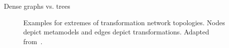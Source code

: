 Dense graphs vs. trees

\begin{figure}
    \centering
    \begin{minipage}[b]{0.49\columnwidth}
        \centering
        
        \label{fig:properties:topologies:full}
    \end{minipage}
    \hfill
    \begin{minipage}[b]{0.49\columnwidth}
        \centering
        
        \vspace{1em}
        \label{fig:properties:topologies:tree}
    \end{minipage}
    \caption[Extremes of transformation network topologies]{Examples for extremes of transformation network topologies. Nodes depict metamodels and edges depict transformations. Adapted from~.}
    \label{fig:properties:topologies}
\end{figure}



